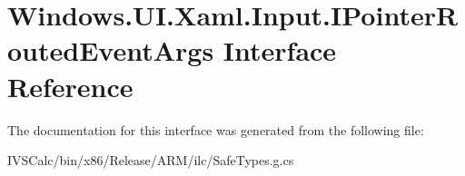 \hypertarget{interface_windows_1_1_u_i_1_1_xaml_1_1_input_1_1_i_pointer_routed_event_args}{}\section{Windows.\+U\+I.\+Xaml.\+Input.\+I\+Pointer\+Routed\+Event\+Args Interface Reference}
\label{interface_windows_1_1_u_i_1_1_xaml_1_1_input_1_1_i_pointer_routed_event_args}


The documentation for this interface was generated from the following file\+:\begin{DoxyCompactItemize}
\item 
I\+V\+S\+Calc/bin/x86/\+Release/\+A\+R\+M/ilc/Safe\+Types.\+g.\+cs\end{DoxyCompactItemize}
